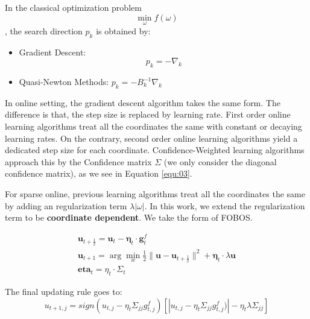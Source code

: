 \documentclass{article}
\begin{document}
In the classical optimization problem $$\min_{\omega}f(\omega)$$, the
search direction $p_k$ is obtained by:
\begin{itemize}
  \item Gradient Descent: $$p_k = -\nabla_k$$
  \item Quasi-Newton Methods: $p_k = -B_k^{-1}\nabla_k$
\end{itemize}

In online setting, the gradient descent algorithm takes the same form.
The difference is that, the step size is replaced by learning rate.
First order online learning algorithms treat all the coordinates the
same with constant or decaying learning rates. On the contrary, second
order online learning algorithms yield a dedicated step size for each
coordinate. Confidence-Weighted learning algorithms approach this by
the Confidence matrix $\Sigma$ (we only consider the diagonal
confidence matrix), as we see in Equation \ref{equ:03}.

For sparse online, previous learning algorithms treat all the
coordinates the same by adding an regularization term
$\lambda|\omega|$. In this work, we extend the regularization term to
be \textbf{coordinate dependent}. We take the form of FOBOS.

\begin{equation}
  \begin{aligned}
    \bm{u}_{t+\frac{1}{2}} = \bm{u}_t - \bm{\eta}_t\cdot\bm{g}_t^f \\
    \bm{u}_{t+1} = \arg\min_w{\frac{1}{2}\|\bm{u} -
    \bm{u}_{t+\frac{1}{2}}\|^2 + \bm{\eta}_{t}\cdot\lambda\bm{u}} \\
    \bm{eta}_t = \eta_t\cdot\Sigma_t
  \end{aligned}
  \label{equ:04}
\end{equation}

The final updating rule goes to:
\begin{equation}
  u_{t+1,j} = sign(u_{t,j} - \eta_t\Sigma_{jj}g_{t,j}^f)
  [|u_{t,j} - \eta_t\Sigma_{jj}g_{t,j}^f)| - \eta_t\lambda\Sigma_{jj}]
  \label{equ:05}
\end{equation}
\end{document}
